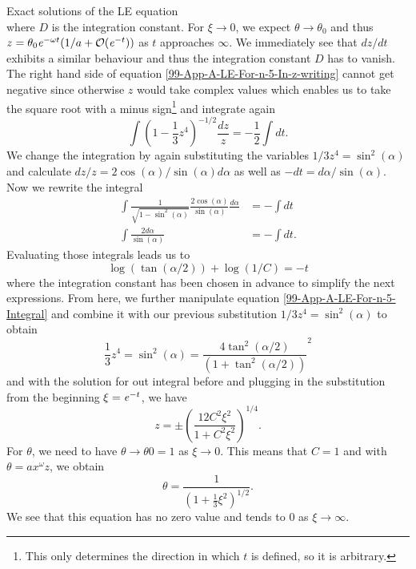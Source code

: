 \begin{appendix}
\begin{section}
\begin{subsection}{Exact solutions of the LE equation}
\begin{equation}
\end{equation}
where $D$ is the integration constant. For $\xi\rightarrow0$, we expect $\theta\rightarrow\theta_0$ and thus $z=\theta_0\mathit{e}^{-\omega t}(1/a+\mathcal{O}(\mathit{e}^{-t}))$ as $t$ approaches $\infty$. We immediately see that $dz/dt$ exhibits a similar behaviour and thus the integration constant $D$ has to vanish.\\
The right hand side of equation \ref{99-App-A-LE-For-n-5-In-z-writing} cannot get negative since otherwise $z$ would take complex values which enables us to take the square root with a minus sign\footnote{This only determines the direction in which $t$ is defined, so it is arbitrary.} and integrate again
\begin{equation}
	\int\left(1-\frac{1}{3}z^4\right)^{-1/2}\frac{dz}{z}=-\frac{1}{2}\int dt.
\end{equation}
We change the integration by again substituting the variables $1/3z^4=\sin^2(\alpha)$ and calculate $dz/z=2\cos(\alpha)/\sin(\alpha)d\alpha$ as well as $-dt=d\alpha/\sin(\alpha)$. Now we rewrite the integral
\begin{align}
	\int\frac{1}{\sqrt{1-\sin^2(\alpha)}}\frac{2\cos(\alpha)}{\sin(\alpha)}\frac{d\alpha}{} &= -\int dt\\
	\int\frac{2d\alpha}{\sin(\alpha)} &= -\int dt.
\end{align}
Evaluating those integrals leads us to
\begin{equation}
	\log(\tan(\alpha/2))+\log(1/C) = -t
	\label{99-App-A-LE-For-n-5-Integral}
\end{equation}
where the integration constant has been chosen in advance to simplify the next expressions. From here, we further manipulate equation \ref{99-App-A-LE-For-n-5-Integral} and combine it with our previous substitution $1/3z^4=\sin^2(\alpha)$ to obtain
\begin{equation}
	\frac{1}{3}z^4=\sin^2(\alpha)=\frac{4\tan^2(\alpha/2)}{\left(1+\tan^2(\alpha/2)\right)}^2
\end{equation}
and with the solution for out integral before and plugging in the substitution from the beginning $\xi=\mathit{e}^{-t}$, we have
\begin{equation}
	z=\pm\left(\frac{12C^2\xi^2}{1+C^2\xi^2}\right)^{1/4}.
\end{equation}
For $\theta$, we need to have $\theta\rightarrow\theta0=1$ as $\xi\rightarrow0$. This means that $C=1$ and with $\theta=ax^\omega z$, we obtain
\begin{equation}
	\theta = \frac{1}{\left(1+\frac{1}{3}\xi^2\right)^{1/2}}.
\end{equation}
We see that this equation has no zero value and tends to $0$ as $\xi\rightarrow\infty$.
\end{subsection}
%
%
\end{section}
\end{appendix}
